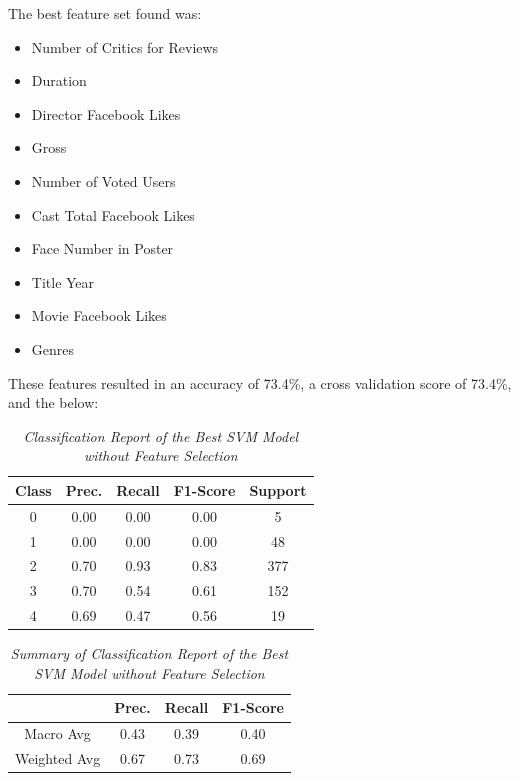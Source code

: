 \documentclass[11pt]{article}
\begin{document}
\noindent
The best feature set found was:
\begin{itemize}
    \item Number of Critics for Reviews
    \item Duration
    \item Director Facebook Likes
    \item Gross
    \item Number of Voted Users
    \item Cast Total Facebook Likes
    \item Face Number in Poster
    \item Title Year
    \item Movie Facebook Likes
    \item Genres
\end{itemize}
\noindent
These features resulted in an accuracy of 73.4\%, a cross validation score of 73.4\%, and the below:

\begin{table}[!ht]
    \begin{center}
        \begin{tabular}{c|c|c|c|c}			
            \hline
            Class & Prec. & Recall & F1-Score & Support \\
            \hline\hline
            0 & 0.00 & 0.00 & 0.00 & 5 \\
            1 & 0.00 & 0.00 & 0.00 & 48 \\
            2 & 0.70 & 0.93 & 0.83 & 377 \\
            3 & 0.70 & 0.54 & 0.61 & 152 \\
            4 & 0.69 & 0.47 & 0.56 & 19\\
                \hline
        \end{tabular}

        \caption{\textit{Classification Report of the Best SVM Model without Feature Selection}}
        \label{svm-ft-report}
    \end{center}
\end{table}

\begin{table}[!ht]
    \begin{center}
        \begin{tabular}{c||c|c|c}			
            \hline
             & Prec. & Recall & F1-Score \\
            \hline\hline
            Macro Avg & 0.43 & 0.39 & 0.40 \\
            Weighted Avg & 0.67 & 0.73 & 0.69 \\
                \hline
        \end{tabular}

        \caption{\textit{Summary of Classification Report of the Best SVM Model without Feature Selection}}
        \label{svm-ft-report-sum}

    \end{center}
\end{table}
\end{document}
